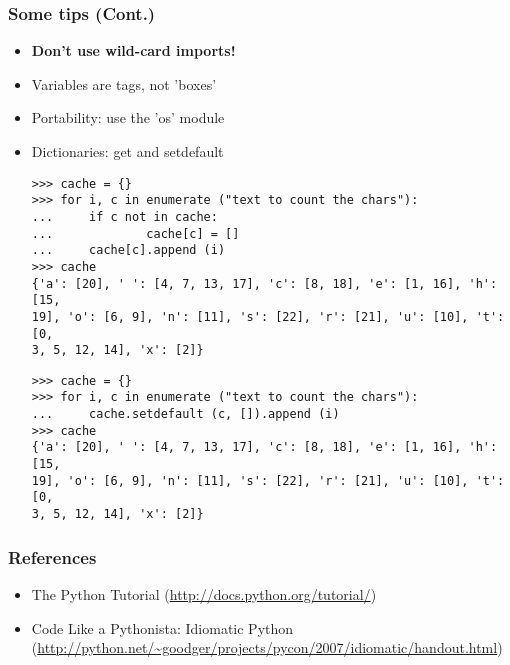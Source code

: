 \begin{frame}[fragile]
  \frametitle{Some tips (Cont.)}
  \begin{itemize}
  \item {\bf Don't use wild-card imports!}
  \item Variables are tags, not 'boxes'
  \item Portability: use the 'os' module
  \item Dictionaries: get and setdefault
{\tiny
\begin{verbatim}
>>> cache = {}
>>> for i, c in enumerate ("text to count the chars"):
...     if c not in cache:
...             cache[c] = []
...     cache[c].append (i)
>>> cache
{'a': [20], ' ': [4, 7, 13, 17], 'c': [8, 18], 'e': [1, 16], 'h': [15,
19], 'o': [6, 9], 'n': [11], 's': [22], 'r': [21], 'u': [10], 't': [0,
3, 5, 12, 14], 'x': [2]}
\end{verbatim}
\pause
\begin{verbatim}
>>> cache = {}
>>> for i, c in enumerate ("text to count the chars"):
...     cache.setdefault (c, []).append (i)
>>> cache
{'a': [20], ' ': [4, 7, 13, 17], 'c': [8, 18], 'e': [1, 16], 'h': [15,
19], 'o': [6, 9], 'n': [11], 's': [22], 'r': [21], 'u': [10], 't': [0,
3, 5, 12, 14], 'x': [2]}
\end{verbatim}
}    
  \end{itemize}
\end{frame}

\begin{frame}
  \frametitle{References}
  \begin{itemize}
  \item The Python Tutorial (\url{http://docs.python.org/tutorial/})
  \item Code Like a Pythonista: Idiomatic Python
    (\url{http://python.net/~goodger/projects/pycon/2007/idiomatic/handout.html})
  \end{itemize}
\end{frame}


